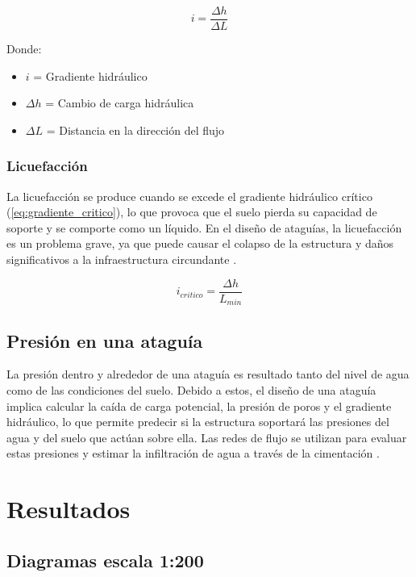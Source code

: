 \begin{equation}
    i = \frac{\Delta h}{\Delta L}
    \label{eq:gradiente_hidraulico}
\end{equation}

Donde:
\begin{itemize}
    \item $i$ = Gradiente hidráulico
    \item $\Delta h$ = Cambio de carga hidráulica
    \item $\Delta L$ = Distancia en la dirección del flujo
\end{itemize}

\subsubsection{Licuefacción}
La licuefacción se produce cuando se excede el gradiente hidráulico crítico (\ref{eq:gradiente_critico}), lo que provoca que el suelo pierda su capacidad de soporte y se comporte como un líquido. En el diseño de ataguías, la licuefacción es un problema grave, ya que puede causar el colapso de la estructura y daños significativos a la infraestructura circundante \citep{budhu_soil_2010}.

\begin{equation}
    i_{critico} = \frac{\Delta h}{L_{min}}
    \label{eq:gradiente_critico}
\end{equation}

\subsection{Presión en una ataguía}
La presión dentro y alrededor de una ataguía es resultado tanto del nivel de agua como de las condiciones del suelo. Debido a estos, el diseño de una ataguía implica calcular la caída de carga potencial, la presión de poros y el gradiente hidráulico, lo que permite predecir si la estructura soportará las presiones del agua y del suelo que actúan sobre ella. Las redes de flujo se utilizan para evaluar estas presiones y estimar la infiltración de agua a través de la cimentación \citep{sivakugan2005}.

\section{Resultados}

\subsection{Diagramas escala 1:200}

